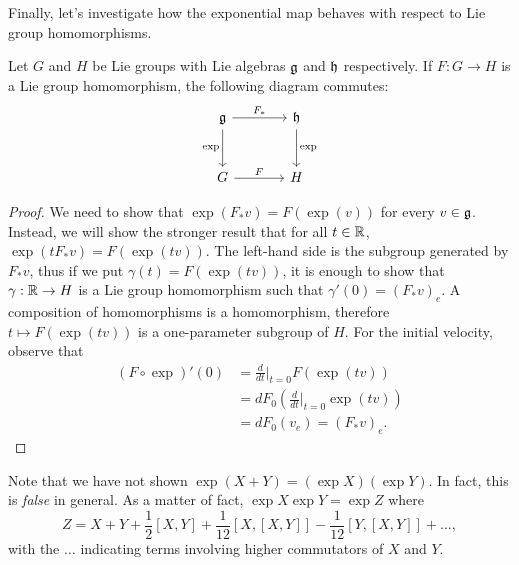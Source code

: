 Finally, let's investigate how the exponential map behaves with respect to Lie group homomorphisms.

\begin{proposition}
	Let $G$ and $H$ be Lie groups with Lie algebras $\mathfrak{g}$ and $\mathfrak{h}$ respectively.
	If $F:G\to H$ is a Lie group homomorphism, the following diagram commutes:
	\begin{equation}\nonumber
		\begin{tikzcd}[row sep=large, column sep=large]
			\fg \arrow[r, "F_*"] \arrow[d, "\exp" left] & \fh \arrow[d, "\exp"] \\
			G \arrow[r, "F"] & H
		\end{tikzcd}
	\end{equation}
\end{proposition}
\begin{proof}
	We need to show that $\exp(F_*v) = F(\exp(v))$ for every $v\in \mathfrak{g}$.
	Instead, we will show the stronger result that for all $t\in\mathbb{R}$, $\exp(t F_*v) = F(\exp(tv))$.
	The left-hand side is the subgroup generated by $F_* v$, thus if we put $\gamma(t) = F(\exp(tv))$, it is enough to show that $\gamma:\mathbb{R}\to H$ is a Lie group homomorphism such that $\gamma'(0) = (F_*v)_e$.
	A composition of homomorphisms is a homomorphism, therefore $t\mapsto F(\exp(tv))$ is a one-parameter subgroup of $H$.
	For the initial velocity, observe that
	\begin{align}
		(F\circ\exp)'(0) & = \frac{d}{dt}\Big|_{t=0} F(\exp(tv))               \\
		                 & =dF_0\left(\frac{d}{dt}\Big|_{t=0} \exp(tv) \right) \\
		                 & = dF_0(v_e) = (F_*v)_e.
	\end{align}
\end{proof}

\begin{remark}
	Note that we have not shown $\exp(X + Y) = (\exp X)(\exp Y)$.
	In fact, this is \emph{false} in general.
	As a matter of fact, $\exp X \exp Y = \exp Z$ where
	\begin{equation}
		Z = X + Y + \frac{1}2 [X,Y] + \frac1{12}[X,[X,Y]] - \frac1{12}[Y,[X,Y]] + \ldots,
	\end{equation}
	with the $\ldots$ indicating terms involving higher commutators of $X$ and $Y$.
\end{remark}

